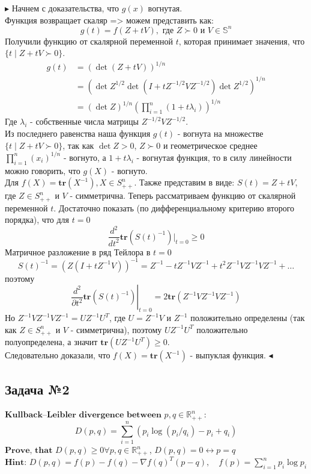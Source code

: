 \documentclass[12pt,letterpaper]{article}
\begin{document}
$\blacktriangleright$ Начнем с доказательства, что $ g(x) $ вогнутая.\\
Функция возвращает скаляр => можем представить как:
$$
g(t)=f(Z+t V), \text { где } Z \succ 0 \text { и } V \in \mathbb{S}^{n}
$$
Получили функцию от скалярной переменной $ t $, которая принимает значения, что $\{t \mid Z+t V \succ 0\}$.
$$
\begin{aligned}
g(t) &=(\operatorname{det}(Z+t V))^{1 / n} \\
&=\left(\operatorname{det} Z^{1 / 2} \operatorname{det}\left(I+t Z^{-1 / 2} V Z^{-1 / 2}\right) \operatorname{det} Z^{1 / 2}\right)^{1 / n} \\
&=(\operatorname{det} Z)^{1 / n}\left(\prod_{i=1}^{n}\left(1+t \lambda_{i}\right)\right)^{1 / n}
\end{aligned}
$$
Где $ \lambda_i $ - собственные числа матрицы $ Z^{-1 / 2} V Z^{-1 / 2} $.\\
Из последнего равенства наша функция $ g(t) $ - вогнута на множестве $\{t \mid Z+t V \succ 0\}$, так как $ \operatorname{det} Z > 0 $, $ Z \succ 0 $ и геометрическое среднее $\prod\limits_{i=1}^{n}\left(x_{i}\right)^{1 / n}$ - вогнуто, а $ 1 + t \lambda_{i} $ - вогнутая функция, то в силу линейности можно говорить, что $ g(X) $ - вогнуто.\\

Для $f(X) = \mathbf{tr}(X^{-1}), X \in S^n_{++}$. Также представим в виде:
$ S (t) = Z + t V $, где $ Z \in S^n_{++} $ и $ V $ - симметрична. Теперь рассматриваем функцию от скалярной переменной $ t $. Достаточно показать (по дифференциальному критерию второго порядка), что для $t=0$
$$  \dfrac {d ^ 2} {dt ^ 2} \mathbf{tr} (S (t) ^ {- 1}) |_{t = 0} \ge 0 $$
Матричное разложение в ряд Тейлора в $t = 0$
$$ S (t) ^ {- 1} = (Z (I + t Z ^ {- 1} V)) ^ {- 1} = Z ^ {- 1} - t Z ^ {- 1} VZ ^ { -1} + t ^ 2 Z^ {- 1} VZ ^ {- 1} VZ ^ {- 1} + \ldots $$ 
поэтому 
$$ \left. \dfrac {d ^ 2} {\partial t ^ 2} \mathbf{tr} (S (t) ^ {- 1}) \right| _ {t = 0} = 2 \mathbf{tr} (Z ^ { -1} VZ ^ {- 1} VZ ^ {- 1}) $$
Но $ Z ^ {- 1} VZ ^ {- 1} VZ ^ {- 1} = UZ ^ {- 1} U ^ T $, где $ U = Z ^ {- 1} V $ и $ Z ^ {- 1 } $ положительно определены (так как $ Z \in S^n_{++} $ и  $ V $ - симметрична), поэтому $ UZ ^ {- 1} U ^ T $ положительно полуопределена, а значит $ \mathbf{tr} (UZ ^ {- 1} U ^ T) \ge 0 $.\\
Следовательно доказали, что $f(X) = \mathbf{tr}(X^{-1})$ - выпуклая функция. $\blacktriangleleft$

\subsection*{Задача №2}
$\textbf{Kullback–Leibler divergence between}$ $p,q \in \mathbb{R}^n_{++}$:
$$ D(p,q) = \sum\limits_{i=1}^n (p_i \log(p_i/q_i) - p_i + q_i) $$
$\textbf{Prove, that}$ $D(p,q) \geq 0 \forall p,q \in \mathbb{R}^n_{++}$, $D(p,q) = 0 \leftrightarrow p = q$\\
$\textbf{Hint:}$ $ D(p,q) = f(p) - f(q) - \nabla f(q)^T(p-q), \quad f(p) = \sum\limits_{i=1}^n p_i \log p_i $
\end{document}
